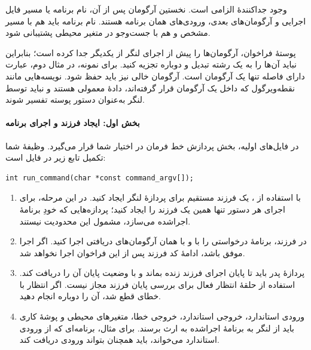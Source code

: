 وجود جداکنندهٔ \lr{\texttt{--}} الزامی است. نخستین آرگومان پس از آن، نام
برنامه یا مسیر فایل اجرایی و آرگومان‌های بعدی، ورودی‌های همان برنامه هستند.
نام برنامه باید هم با مسیر مشخص و هم با جست‌وجو در متغیر محیطی
 پشتیبانی شود.

پوستهٔ فراخوان، آرگومان‌ها را پیش از اجرای لنگر از یکدیگر جدا کرده است؛
بنابراین نباید آن‌ها را به یک رشته تبدیل و دوباره تجزیه کنید. برای نمونه،
در مثال دوم، عبارت دارای فاصله تنها یک آرگومان است. آرگومان خالی نیز باید
حفظ شود. نویسه‌هایی مانند نقطه‌ویرگول که داخل یک آرگومان قرار گرفته‌اند،
دادهٔ معمولی هستند و نباید توسط لنگر به‌عنوان دستور پوسته تفسیر شوند.

\paragraph{بخش اول: ایجاد فرزند و اجرای برنامه}
در فایل‌های اولیه، بخش پردازش خط فرمان در اختیار شما قرار می‌گیرد.
وظیفهٔ شما تکمیل تابع زیر در فایل  است:

\begin{latin}
\begin{verbatim}
int run_command(char *const command_argv[]);
\end{verbatim}
\end{latin}

\begin{enumerate}
  \item با استفاده از ، یک فرزند مستقیم برای پردازهٔ
  لنگر ایجاد کنید. در این مرحله، برای اجرای هر دستور تنها همین یک فرزند
  را ایجاد کنید؛ پردازه‌هایی که خودِ برنامهٔ اجراشده می‌سازد، مشمول این
  محدودیت نیستند.

  \item در فرزند، برنامهٔ درخواستی را با  و با همان
  آرگومان‌های دریافتی اجرا کنید. اگر اجرا موفق باشد، ادامهٔ کد فرزند پس از
  این فراخوان اجرا نخواهد شد.

  \item پردازهٔ پدر باید تا پایان اجرای فرزند زنده بماند و با
   وضعیت پایان آن را دریافت کند. استفاده از حلقهٔ
  انتظار فعال برای بررسی پایان فرزند مجاز نیست. اگر انتظار با خطای
   قطع شد، آن را دوباره انجام دهید.

  \item ورودی استاندارد، خروجی استاندارد، خروجی خطا، متغیرهای محیطی و
  پوشهٔ کاری باید از لنگر به برنامهٔ اجراشده به ارث برسند. برای مثال،
  برنامه‌ای که از ورودی استاندارد می‌خواند، باید همچنان بتواند ورودی
  دریافت کند.
\end{enumerate}

